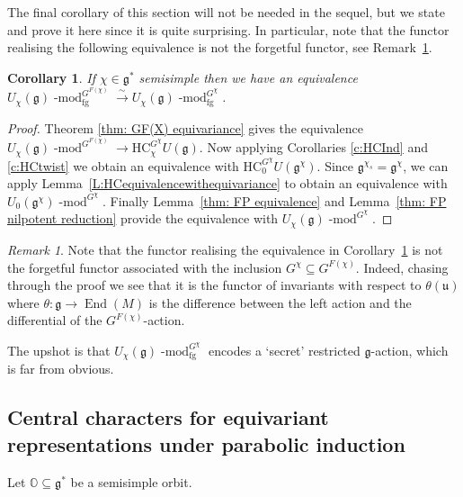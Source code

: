 \documentclass[twoside,12pt,reqno]{amsart}
\newtheorem{Corollary}[Theorem]{Corollary}
\theoremstyle{remark}
\newtheorem{Remark}[Theorem]{Remark}
\numberwithin{equation}{section}
\def\isoto{\overset{\sim}{\longrightarrow}}
\def\lmod{\!\operatorname{-mod}}
\def\End{\operatorname{End}}
\def\O{{\mathbb O}}
\def\HC{\mathrm{HC}}
\def\g{{\mathfrak g}}
\def\u{\mathfrak{u}}
\newcommand{\fg}{\operatorname{fg}}
\begin{document}
The final corollary of this section will not be needed in the sequel, but we state and prove it here since it is quite surprising. In particular, note that the functor realising the following equivalence is not the forgetful functor, see Remark~\ref{R:curiousequiv}.
\begin{Corollary}
\label{C:semisimplesurpiseequivariance}
    If $\chi \in \g^*$ semisimple then we have an equivalence $U_\chi (\g) \lmod^{G^{F(\chi)}}_{\fg} \isoto U_\chi (\g) \lmod^{G^\chi}_{\fg}$.
\end{Corollary}

\begin{proof}
Theorem \ref{thm: GF(X) equivariance} gives the equivalence $U_\chi (\g) \lmod^{G^{F(\chi)}} \to \HC_\chi^{G^\chi} U(\g)$. Now applying Corollaries \ref{c:HCInd} and \ref{c:HCtwist} we obtain an equivalence with $\HC_0^{G^\chi} U(\g^\chi)$. Since $\g^{\chi_s} = \g^\chi$, we can apply Lemma~\ref{L:HCequivalencewithequivariance} to obtain an equivalence with $U_0 (\g^\chi) \lmod^{G^\chi}$. Finally Lemma~\ref{thm: FP equivalence} and Lemma~\ref{thm: FP nilpotent reduction} provide the equivalence with $U_\chi (\g) \lmod^{G^\chi}$.
\end{proof}

\begin{Remark}
    \label{R:curiousequiv}
    Note that the functor realising the equivalence in Corollary~\ref{C:semisimplesurpiseequivariance} is not the forgetful functor associated with the inclusion $G^\chi \subseteq G^{F(\chi)}$. Indeed, chasing through the proof we see that it is the functor of invariants with respect to $\theta(\u)$ where $\theta : \g \to \End(M)$ is the difference between the left action and the differential of the $G^{F(\chi)}$-action.
    
    The upshot is that $U_\chi(\g)\lmod^{G^\chi}_{\fg}$ encodes a `secret' restricted $\g$-action, which is far from obvious.
\end{Remark}


\subsection{Central characters for equivariant representations under parabolic induction}
\label{ss:centralcharactersunderparabolic}

Let $\O \subseteq \g^*$ be a semisimple orbit.
\end{document}
